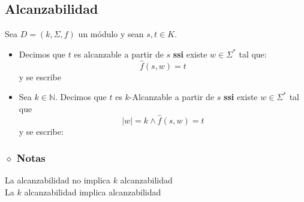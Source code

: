 \subsection{Alcanzabilidad}
Sea $D =(k,\Sigma,f)$ un módulo y sean $s,t\in K$.
\begin{itemize}
\item Decimos que $t$ es alcanzable a partir de $s$ \textbf{ssi} existe $w\in\Sigma^*$ tal que:
$$
	\hat{f}(s,w)=t
$$
y se escribe 

\begin{center}
\end{center}
\item Sea $k\in\mathbb{N}$. Decimos que $t$ es $k$-Alcanzable a partir de $s$ \textbf{ssi} existe $w\in\Sigma^*$ tal que $$|w|=k \wedge \hat{f}(s,w)=t$$  y se escribe:
\begin{center}
\end{center}

\end{itemize}
\subsubsection*{$\diamond$ Notas}\noindent
La alcanzabilidad no implica $k$ alcanzabilidad \\ 
La $k$ alcanzabilidad implica alcanzabilidad

